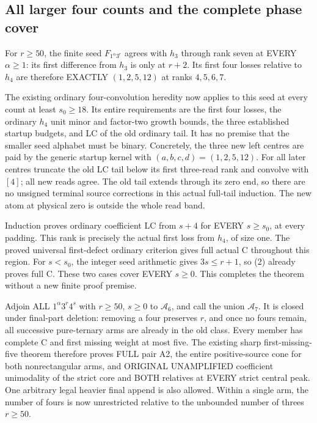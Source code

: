 \subsection{All larger four counts and the complete phase cover}
For $r\ge50$, the finite seed $F_{1^\alpha3^r}$ agrees with $h_3$
through rank seven at EVERY $\alpha\ge1$: its first difference from
$h_3$ is only at $r+2$. Its first four losses relative to $h_4$ are
therefore EXACTLY $(1,2,5,12)$ at ranks $4,5,6,7$.

The existing ordinary four-convolution heredity now applies to this
seed at every count at least $s_0\ge18$. Its entire requirements are
the first four losses, the ordinary $h_4$ unit minor and factor-two
growth bounds, the three established startup budgets, and LC of the
old ordinary tail. It has no premise that the smaller seed alphabet
must be binary. Concretely, the three new left centres are paid by
the generic startup kernel with $(a,b,c,d)=(1,2,5,12)$.
For all later centres truncate the old LC tail below its first
three-read rank and convolve with $[4]$; all new reads agree.
The old tail extends through its zero end, so there are no unsigned
terminal source corrections in this actual full-tail induction.
The new atom at physical zero is outside the whole read band.

Induction proves ordinary coefficient LC from $s+4$ for EVERY
$s\ge s_0$, at every padding. This rank is precisely the actual first
loss from $h_4$, of size one. The proved universal first-defect
ordinary criterion gives full actual C throughout this region.
For $s<s_0$, the integer seed arithmetic gives $3s\le r+1$, so (2)
already proves full C. These two cases cover EVERY $s\ge0$.
This completes the theorem without a new finite proof premise.

\begin{corollary}
Adjoin ALL $1^\alpha3^r4^s$ with $r\ge50$, $s\ge0$ to $\mathcal A_6$,
and call the union $\mathcal A_7$. It is closed under final-part
deletion: removing a four preserves $r$, and once no fours remain,
all successive pure-ternary arms are already in the old class.
Every member has complete C and first missing weight at most five.
The existing sharp first-missing-five theorem therefore proves FULL
pair A2, the entire positive-source cone for both nonrectangular arms,
and ORIGINAL UNAMPLIFIED coefficient unimodality of the strict core
and BOTH relatives at EVERY strict central peak. One arbitrary
legal heavier final append is also allowed.
Within a single arm, the number of fours is now unrestricted relative
to the unbounded number of threes $r\ge50$.
\end{corollary}

